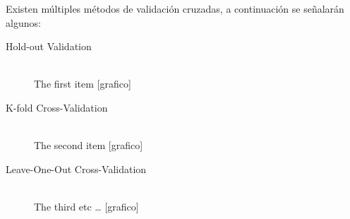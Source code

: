Existen múltiples métodos de validación cruzadas, a continuación se señalarán algunos:
    \begin{description}
      \item[Hold-out Validation] \hfill \\
      The first item
      [grafico]
      \item[K-fold Cross-Validation] \hfill \\
      The second item
      [grafico]
      \item[Leave-One-Out Cross-Validation] \hfill \\
      The third etc \ldots
      [grafico]
    \end{description}

